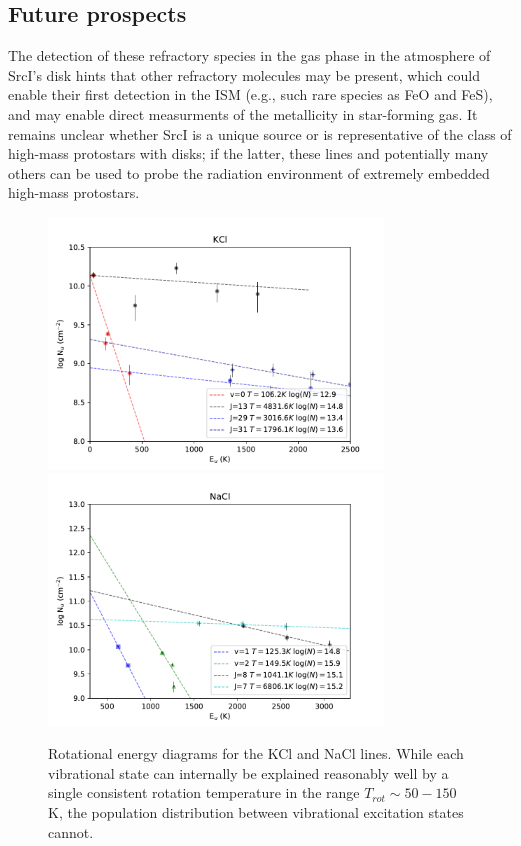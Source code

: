 \documentclass[twocolumn]{aastex62}
\newcommand{\sourcei}{SrcI\xspace}
\begin{document}
\subsection{Future prospects}
The detection of these refractory species in the gas phase in the atmosphere
of \sourcei's disk hints that other refractory molecules may be present, 
which could enable their first detection in the ISM (e.g., such rare species as
FeO and FeS), and may enable direct measurments of the metallicity in
star-forming gas.
It remains unclear whether \sourcei is a unique source or is representative
of the class of high-mass protostars with disks; if the latter, these lines
and potentially many others can be used to probe the radiation environment of 
extremely embedded high-mass protostars.

\begin{figure}[!htp]
\includegraphics[scale=1,width=3.5in]{figures/KCl_rotational_diagrams.pdf}
\includegraphics[scale=1,width=3.5in]{figures/NaCl_rotational_diagrams.pdf}
\caption{Rotational energy diagrams for the KCl and NaCl lines.  While each
vibrational state can internally be explained reasonably well by a single
consistent rotation temperature in the range $T_{rot}\sim50-150$ K, the population
distribution between vibrational excitation states cannot.}
\label{fig:rotationdiagrams}
\end{figure}
\end{document}
